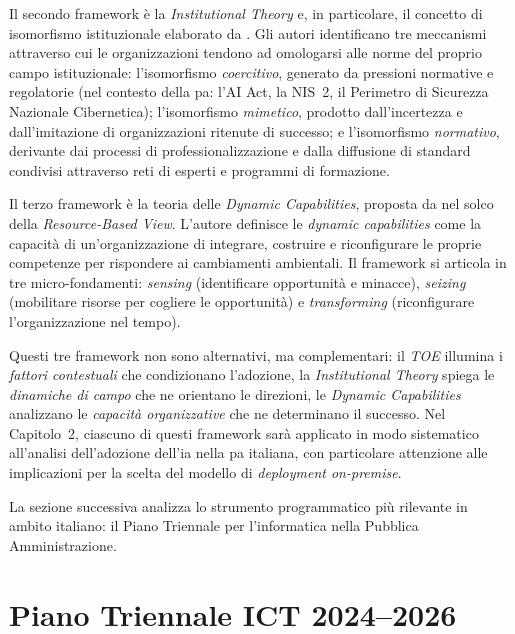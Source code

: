 Il secondo framework è la \textit{Institutional Theory} e, in particolare, il concetto di isomorfismo istituzionale elaborato da \textcite{DiMaggioPow1983}. Gli autori identificano tre meccanismi attraverso cui le organizzazioni tendono ad omologarsi alle norme del proprio campo istituzionale: l'isomorfismo \textit{coercitivo}, generato da pressioni normative e regolatorie (nel contesto della \gls{pa}: l'AI Act, la NIS~2, il Perimetro di Sicurezza Nazionale Cibernetica); l'isomorfismo \textit{mimetico}, prodotto dall'incertezza e dall'imitazione di organizzazioni ritenute di successo; e l'isomorfismo \textit{normativo}, derivante dai processi di professionalizzazione e dalla diffusione di standard condivisi attraverso reti di esperti e programmi di formazione.

Il terzo framework è la teoria delle \textit{Dynamic Capabilities}, proposta da \textcite{Teece2007} nel solco della \textit{Resource-Based View}. L'autore definisce le \textit{dynamic capabilities} come la capacità di un'organizzazione di integrare, costruire e riconfigurare le proprie competenze per rispondere ai cambiamenti ambientali. Il framework si articola in tre micro-fondamenti: \textit{sensing} (identificare opportunità e minacce), \textit{seizing} (mobilitare risorse per cogliere le opportunità) e \textit{transforming} (riconfigurare l'organizzazione nel tempo).

Questi tre framework non sono alternativi, ma complementari: il \textit{TOE} illumina i \textit{fattori contestuali} che condizionano l'adozione, la \textit{Institutional Theory} spiega le \textit{dinamiche di campo} che ne orientano le direzioni, le \textit{Dynamic Capabilities} analizzano le \textit{capacità organizzative} che ne determinano il successo. Nel Capitolo~2, ciascuno di questi framework sarà applicato in modo sistematico all'analisi dell'adozione dell'\gls{ia} nella \gls{pa} italiana, con particolare attenzione alle implicazioni per la scelta del modello di \textit{deployment on-premise}.

La sezione successiva analizza lo strumento programmatico più rilevante in ambito italiano: il Piano Triennale per l'informatica nella Pubblica Amministrazione.


\section{Piano Triennale ICT 2024--2026}
\label{sec:piano-triennale}

